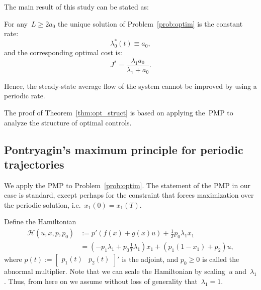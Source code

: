 The main result of this study can be stated as:
%
\begin{theorem}\label{thm:opt_struct}
	For any~$L\geq  2  a_0$ the unique solution of Problem~\ref{prob:optim} is the constant rate:
	\begin{equation}\label{optimal_u1} 
		\lambda_0^*(t) \equiv  a_0,
	\end{equation}
	and the corresponding optimal cost is:
	\begin{equation}
		J^*= \frac{\lambda_1 a_0}{\lambda_1+ a_0}.
	\end{equation}
\end{theorem}
%
Hence, the steady-state average flow of the system cannot be improved by using a periodic rate. 

The proof of Theorem~\ref{thm:opt_struct}  is based on applying the~\ac{PMP} to analyze the structure of optimal controls.

\subsection{Pontryagin's maximum principle for periodic trajectories} 

We apply the  \ac{PMP} to Problem~\ref{prob:optim}. 
The statement  of the \ac{PMP} in our case  is standard, except perhaps for the constraint that forces maximization over the periodic solution, i.e.~$x_1(0)=x_1(T)$.

Define the Hamiltonian 
%
\begin{subequations}
	\begin{align} \label{eq:hamiltonian}
		\mathcal H(u,x,p,p_0) &:= p' \left(f(x)+g(x) u  \right) 
		+\frac{1}{T} p_0 \lambda_1 x_1  \\
		&= (-p_1 \lambda_1  + p_0 \frac{1}{T} \lambda_1 ) x_1 
		+ (p_1(1-x_1)+p_2) u,
	\end{align}
\end{subequations}
%
where $p(t):=\begin{bmatrix} p_1(t)&p_2(t)\end{bmatrix}'$ is the adjoint, and $p_0\ge 0$ is called the abnormal multiplier.
Note that we can scale the Hamiltonian by scaling~$u$ and~$\lambda_1$. Thus, from here on we assume without loss of generality that~$\lambda_1=1$.

